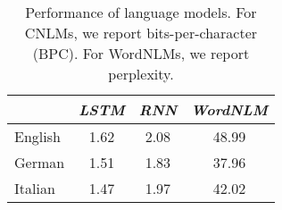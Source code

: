 \begin{table}[t]
  \begin{small}
  \begin{center}
    \begin{tabular}{l|c|c|c}
      \multicolumn{1}{c|}{}&\emph{LSTM}&\emph{RNN}&\emph{WordNLM}\\
      \hline
	    English & 1.62 & 2.08 & 48.99  \\
	    German &  1.51 & 1.83 & 37.96   \\
	    Italian & 1.47 & 1.97 & 42.02  \\
    \end{tabular}
  \end{center}
  \end{small}
  \caption{\label{tab:lm-results} Performance of language models. For CNLMs, we report bits-per-character (BPC). For WordNLMs, we report perplexity.}
\end{table}






